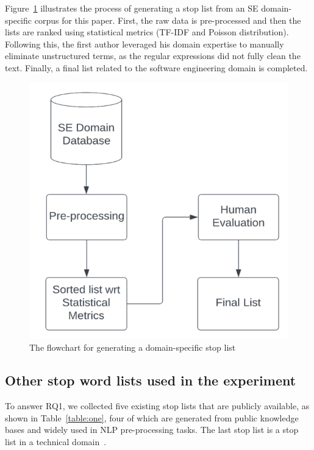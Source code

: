 \documentclass[conference]{IEEEtran}
\begin{document}
\begin{sloppy}
Figure~\ref{fig:flowchart} illustrates the process of generating a stop list from an SE domain-specific corpus for this paper. First, the raw data is pre-processed and then the lists are ranked using statistical metrics (TF-IDF and Poisson distribution). Following this, the first author leveraged his domain expertise to manually eliminate unstructured terms, as the regular expressions did not fully clean the text.
Finally, a final list related to the software engineering domain is completed. 

\begin{figure}
    \centering
    \includegraphics[scale=0.7]{flowchart.png}
    \caption{The flowchart for generating a domain-specific stop list}
    \label{fig:flowchart}
\end{figure}

\subsection{Other stop word lists used in the experiment}

To answer RQ1, we collected five existing stop lists that are publicly available, as shown in Table~\ref{table:one}, four of which are generated from public knowledge bases and widely used in NLP pre-processing tasks. The last stop list is a stop list in a technical domain~\cite{sarica2021stopwords}. 


\end{sloppy}
\end{document}
